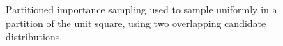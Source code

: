 \begin{figure}[!tb]
\centering
{}
\hspace{0.1in}
\caption[ ]{Partitioned importance sampling used to sample uniformly in a partition of the unit square, using two overlapping candidate distributions.}
\label{fig:pimp-sampling-2d}
\end{figure}

